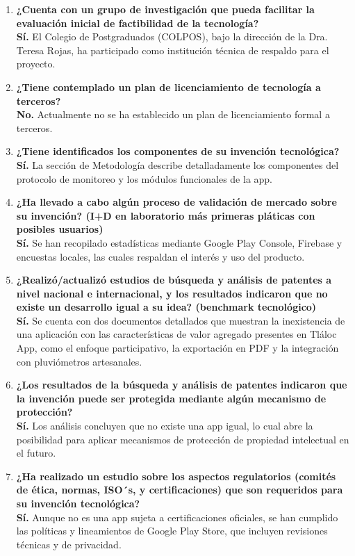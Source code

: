 \begin{enumerate}
\item \textbf{¿Cuenta con un grupo de investigación que pueda facilitar la evaluación inicial de factibilidad de la tecnología?} \\
\textbf{Sí.} El Colegio de Postgraduados (COLPOS), bajo la dirección de la Dra. Teresa Rojas, ha participado como institución técnica de respaldo para el proyecto.

\item \textbf{¿Tiene contemplado un plan de licenciamiento de tecnología a terceros?} \\
\textbf{No.} Actualmente no se ha establecido un plan de licenciamiento formal a terceros.

\item \textbf{¿Tiene identificados los componentes de su invención tecnológica?} \\
\textbf{Sí.} La sección de Metodología describe detalladamente los componentes del protocolo de monitoreo y los módulos funcionales de la app.

\item \textbf{¿Ha llevado a cabo algún proceso de validación de mercado sobre su invención? (I+D en laboratorio más primeras pláticas con posibles usuarios)} \\
\textbf{Sí.} Se han recopilado estadísticas mediante Google Play Console, Firebase y encuestas locales, las cuales respaldan el interés y uso del producto.


\item \textbf{¿Realizó/actualizó estudios de búsqueda y análisis de patentes a nivel nacional e internacional, y los resultados indicaron que no existe un desarrollo igual a su idea? (benchmark tecnológico)} \\
\textbf{Sí.} Se cuenta con dos documentos detallados que muestran la inexistencia de una aplicación con las características de valor agregado presentes en Tláloc App, como el enfoque participativo, la exportación en PDF y la integración con pluviómetros artesanales.

\item \textbf{¿Los resultados de la búsqueda y análisis de patentes indicaron que la invención puede ser protegida mediante algún mecanismo de protección?} \\
\textbf{Sí.} Los análisis concluyen que no existe una app igual, lo cual abre la posibilidad para aplicar mecanismos de protección de propiedad intelectual en el futuro.

\item \textbf{¿Ha realizado un estudio sobre los aspectos regulatorios (comités de ética, normas, ISO´s, y certificaciones) que son requeridos para su invención tecnológica?} \\
\textbf{Sí.} Aunque no es una app sujeta a certificaciones oficiales, se han cumplido las políticas y lineamientos de Google Play Store, que incluyen revisiones técnicas y de privacidad.


\end{enumerate}
